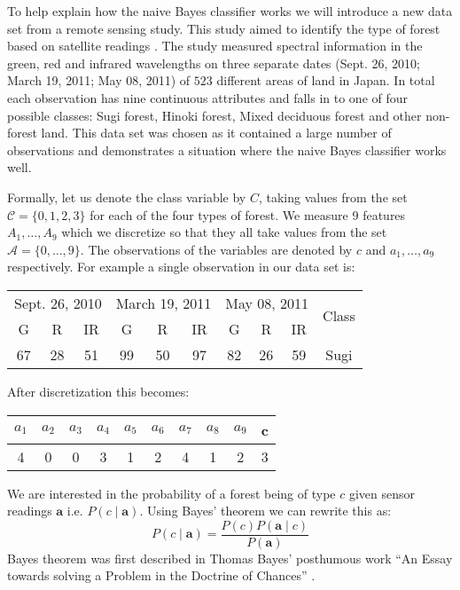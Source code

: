 To help explain how the naive Bayes classifier works we will introduce a new data set from a remote sensing study.
This study aimed to identify the type of forest based on satellite readings \cite{Forrest}.
The study measured spectral information in the green, red and infrared wavelengths on three separate dates (Sept. 26, 2010; March 19, 2011; May 08, 2011) of $523$ different areas of land in Japan.
In total each observation has nine continuous attributes and falls in to one of four possible classes: Sugi forest, Hinoki forest, Mixed deciduous forest and other non-forest land.
This data set was chosen as it contained a large number of observations and demonstrates a situation where the naive Bayes classifier works well.

Formally, let us denote the class variable by $C$, taking values from the set $\mathcal{C} = \{0,1,2,3\}$ for each of the four types of forest.
We measure 9 features $A_1,\dots,A_9$ which we discretize so that they all take values from the set $\mathcal{A} = \{0,\dots,9\}$.
The observations of the variables are denoted by $c$ and $a_1,\dots,a_9$ respectively.
For example a single observation in our data set is:
\begin{center}
\begin{tabular}{c c c c c c c c c c}
\hline
\multicolumn{3}{c}{Sept. 26, 2010} & \multicolumn{3}{c}{March 19, 2011} & \multicolumn{3}{c}{May 08, 2011} & \multirow{2}{*}{Class} \\
G & R & IR & G & R & IR & G & R & IR \\
\hline
67&28&51&99&50&97&82&26&59 & Sugi \\
\hline
\end{tabular}
\end{center}
After discretization this becomes:
\begin{center}
\begin{tabular}{c c c c c c c c c c}
\hline
$a_1$ & $a_2$ & $a_3$ & $a_4$ & $a_5$ & $a_6$ & $a_7$ & $a_8$ & $a_9$ & c \\
\hline
4     & 0     & 0     & 3     & 1     & 2     & 4     & 1     & 2     & 3\\
\hline
\end{tabular}
\end{center}

We are interested in the probability of a forest being of type $c$ given sensor readings $\mathbf{a}$ i.e. $P(c \mid \mathbf{a})$.
Using Bayes' theorem we can rewrite this as:
\begin{equation} \label{bayes}
	P(c \mid \mathbf{a}) = \frac{P(c)P(\mathbf{a} \mid c)}{P(\mathbf{a})}
\end{equation}
Bayes theorem was first described in Thomas Bayes' posthumous work ``An Essay towards solving a Problem in the Doctrine of Chances'' \cite{Bayes63}.

